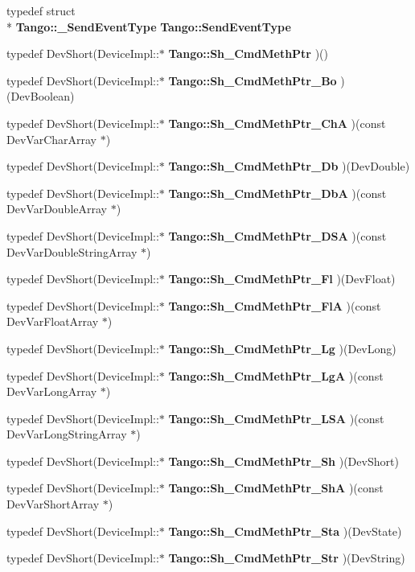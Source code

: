 \begin{DoxyCompactItemize}
typedef struct \\*
{\bf Tango\-::\-\_\-\-Send\-Event\-Type} {\bf Tango\-::\-Send\-Event\-Type}
\item 
typedef Dev\-Short(Device\-Impl\-::$\ast$ {\bf Tango\-::\-Sh\-\_\-\-Cmd\-Meth\-Ptr} )()
\item 
typedef Dev\-Short(Device\-Impl\-::$\ast$ {\bf Tango\-::\-Sh\-\_\-\-Cmd\-Meth\-Ptr\-\_\-\-Bo} )(Dev\-Boolean)
\item 
typedef Dev\-Short(Device\-Impl\-::$\ast$ {\bf Tango\-::\-Sh\-\_\-\-Cmd\-Meth\-Ptr\-\_\-\-Ch\-A} )(const Dev\-Var\-Char\-Array $\ast$)
\item 
typedef Dev\-Short(Device\-Impl\-::$\ast$ {\bf Tango\-::\-Sh\-\_\-\-Cmd\-Meth\-Ptr\-\_\-\-Db} )(Dev\-Double)
\item 
typedef Dev\-Short(Device\-Impl\-::$\ast$ {\bf Tango\-::\-Sh\-\_\-\-Cmd\-Meth\-Ptr\-\_\-\-Db\-A} )(const Dev\-Var\-Double\-Array $\ast$)
\item 
typedef Dev\-Short(Device\-Impl\-::$\ast$ {\bf Tango\-::\-Sh\-\_\-\-Cmd\-Meth\-Ptr\-\_\-\-D\-S\-A} )(const Dev\-Var\-Double\-String\-Array $\ast$)
\item 
typedef Dev\-Short(Device\-Impl\-::$\ast$ {\bf Tango\-::\-Sh\-\_\-\-Cmd\-Meth\-Ptr\-\_\-\-Fl} )(Dev\-Float)
\item 
typedef Dev\-Short(Device\-Impl\-::$\ast$ {\bf Tango\-::\-Sh\-\_\-\-Cmd\-Meth\-Ptr\-\_\-\-Fl\-A} )(const Dev\-Var\-Float\-Array $\ast$)
\item 
typedef Dev\-Short(Device\-Impl\-::$\ast$ {\bf Tango\-::\-Sh\-\_\-\-Cmd\-Meth\-Ptr\-\_\-\-Lg} )(Dev\-Long)
\item 
typedef Dev\-Short(Device\-Impl\-::$\ast$ {\bf Tango\-::\-Sh\-\_\-\-Cmd\-Meth\-Ptr\-\_\-\-Lg\-A} )(const Dev\-Var\-Long\-Array $\ast$)
\item 
typedef Dev\-Short(Device\-Impl\-::$\ast$ {\bf Tango\-::\-Sh\-\_\-\-Cmd\-Meth\-Ptr\-\_\-\-L\-S\-A} )(const Dev\-Var\-Long\-String\-Array $\ast$)
\item 
typedef Dev\-Short(Device\-Impl\-::$\ast$ {\bf Tango\-::\-Sh\-\_\-\-Cmd\-Meth\-Ptr\-\_\-\-Sh} )(Dev\-Short)
\item 
typedef Dev\-Short(Device\-Impl\-::$\ast$ {\bf Tango\-::\-Sh\-\_\-\-Cmd\-Meth\-Ptr\-\_\-\-Sh\-A} )(const Dev\-Var\-Short\-Array $\ast$)
\item 
typedef Dev\-Short(Device\-Impl\-::$\ast$ {\bf Tango\-::\-Sh\-\_\-\-Cmd\-Meth\-Ptr\-\_\-\-Sta} )(Dev\-State)
\item 
typedef Dev\-Short(Device\-Impl\-::$\ast$ {\bf Tango\-::\-Sh\-\_\-\-Cmd\-Meth\-Ptr\-\_\-\-Str} )(Dev\-String)

\end{DoxyCompactItemize}
